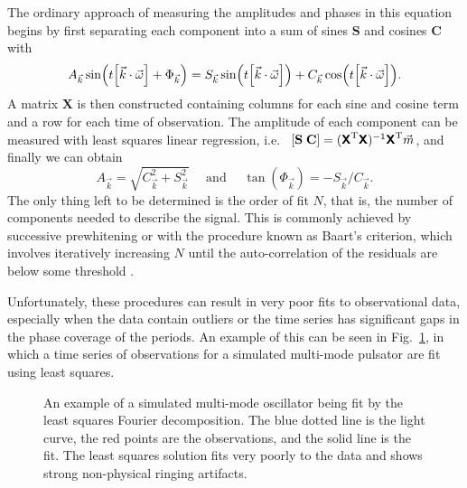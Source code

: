 \documentclass[11pt,twoside]{book}
\begin{document}
The ordinary approach of measuring the amplitudes and phases in this equation begins by first separating each component into a sum of sines $\mathbf S$ and cosines $\mathbf C$ with
\begin{equation} \label{eq:varsep}
    A_{\vec k} \sin(t\qty[\vec k\cdot \vec \omega] + \Phi_{\vec k}) = S_{\vec k} \sin(t\qty[\vec k\cdot \vec \omega]) + C_{\vec k} \cos(t\qty[\vec k\cdot \vec \omega]).
\end{equation}
A matrix $\mathbf{X}$ is then constructed containing columns for each sine and cosine term and a row for each time of observation. The amplitude of each component can be measured with least squares linear regression, i.e.~ $\qty[\mathbf{S}\; \mathbf{C}] = (\textsf{\textbf{X}}^\text{T} \textsf{\textbf{X}})^{-1} \textsf{\textbf{X}}^\text{T} \vec{m}$, and finally we can obtain
\begin{equation}
    A_{\vec{k}} = \sqrt{C_{\vec{k}}^2 + S_{\vec{k}}^2} \quad \text{ and } \quad \tan(\Phi_{\vec{k}}) = -S_{\vec{k}} / C_{\vec{k}}.
\end{equation}
The only thing left to be determined is the order of fit $N$, that is, the number of components needed to describe the signal. This is commonly achieved by successive prewhitening or with the procedure known as Baart's criterion, which involves iteratively increasing $N$ until the auto-correlation of the residuals are below some threshold \citep{baart1982use, petersen1986studies}. 

Unfortunately, these procedures can result in very poor fits to observational data, especially when the data contain outliers or the time series has significant gaps in the phase coverage of the periods. An example of this can be seen in Fig.~\ref{fig:badfit}, in which a time series of observations for a simulated multi-mode pulsator are fit using least squares. 

\begin{figure}[!t]
    \centering
    
    \caption{An example of a simulated multi-mode oscillator being fit by the least squares Fourier decomposition. The blue dotted line is the light curve, the red points are the observations, and the solid line is the fit. The least squares solution fits very poorly to the data and shows strong non-physical ringing artifacts.} 
    \label{fig:badfit} 
\end{figure} 
\end{document}
